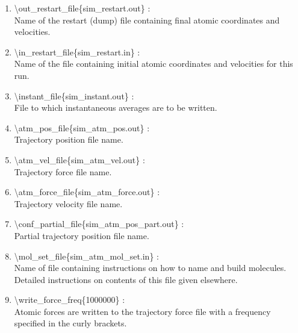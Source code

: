 \documentclass[12pt,titlepage]{article}
\begin{document}
\begin{enumerate}
 \vspace{0.15in} 
 \item   \textbackslash{}out\_restart\_file\{sim\_restart.out\} : \\
   Name of the restart (dump) file containing final atomic 
          coordinates and velocities.

 \vspace{0.15in} 
 \item   \textbackslash{}in\_restart\_file\{sim\_restart.in\} : \\
     Name of the file containing initial atomic coordinates and
     velocities for this run.

 \vspace{0.15in} 
 \item   \textbackslash{}instant\_file\{sim\_instant.out\} : \\
     File to which instantaneous averages are to be written.

 \vspace{0.15in}
 \item   \textbackslash{}atm\_pos\_file\{sim\_atm\_pos.out\} : \\
     Trajectory position file name.

 \vspace{0.15in} 
 \item   \textbackslash{}atm\_vel\_file\{sim\_atm\_vel.out\} : \\
  Trajectory force file name.  

 \vspace{0.15in} 
 \item   \textbackslash{}atm\_force\_file\{sim\_atm\_force.out\} : \\
     Trajectory velocity file name.

 \vspace{0.15in}
 \item   \textbackslash{}conf\_partial\_file\{sim\_atm\_pos\_part.out\} : \\
     Partial trajectory position file name.

 \vspace{0.15in} 
 \item   \textbackslash{}mol\_set\_file\{sim\_atm\_mol\_set.in\} : \\
    Name of file containing instructions on how to name and build molecules.
    Detailed instructions on contents of this file given elsewhere.

 \vspace{0.15in} 
 \item   \textbackslash{}write\_force\_freq\{1000000\} : \\
   Atomic forces are written to the trajectory force file with a
   frequency specified in the curly brackets.


\end{enumerate}
\end{document}
